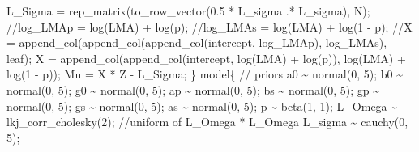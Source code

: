 \documentclass[
  12pt,
  letterpaper,
  DIV=11,
  numbers=noendperiod]{scrartcl}
\newenvironment{Shaded}{\begin{snugshade}}{\end{snugshade}}
\newcommand{\CommentTok}[1]{\textcolor[rgb]{0.37,0.37,0.37}{#1}}
\newcommand{\DecValTok}[1]{\textcolor[rgb]{0.68,0.00,0.00}{#1}}
\newcommand{\FloatTok}[1]{\textcolor[rgb]{0.68,0.00,0.00}{#1}}
\newcommand{\KeywordTok}[1]{\textcolor[rgb]{0.00,0.23,0.31}{#1}}
\newcommand{\NormalTok}[1]{\textcolor[rgb]{0.00,0.23,0.31}{#1}}
\begin{document}
\begin{Shaded}
\begin{Highlighting}[]
\NormalTok{  L\_Sigma = rep\_matrix(to\_row\_vector(}\FloatTok{0.5}\NormalTok{ * L\_sigma .* L\_sigma), N);}
  \CommentTok{//log\_LMAp = log(LMA) + log(p);}
  \CommentTok{//log\_LMAs = log(LMA) + log(1 {-} p);}
  \CommentTok{//X = append\_col(append\_col(append\_col(intercept, log\_LMAp), log\_LMAs), leaf);}
\NormalTok{  X = append\_col(append\_col(intercept, log(LMA) + log(p)), log(LMA) + log(}\DecValTok{1}\NormalTok{ {-} p));}
\NormalTok{  Mu = X * Z {-} L\_Sigma;}
\NormalTok{\}}
\KeywordTok{model}\NormalTok{\{}
  \CommentTok{// priors}
\NormalTok{  a0 \textasciitilde{} normal(}\DecValTok{0}\NormalTok{, }\DecValTok{5}\NormalTok{);}
\NormalTok{  b0 \textasciitilde{} normal(}\DecValTok{0}\NormalTok{, }\DecValTok{5}\NormalTok{);}
\NormalTok{  g0 \textasciitilde{} normal(}\DecValTok{0}\NormalTok{, }\DecValTok{5}\NormalTok{);}
\NormalTok{  ap \textasciitilde{} normal(}\DecValTok{0}\NormalTok{, }\DecValTok{5}\NormalTok{);}
\NormalTok{  bs \textasciitilde{} normal(}\DecValTok{0}\NormalTok{, }\DecValTok{5}\NormalTok{);}
\NormalTok{  gp \textasciitilde{} normal(}\DecValTok{0}\NormalTok{, }\DecValTok{5}\NormalTok{);}
\NormalTok{  gs \textasciitilde{} normal(}\DecValTok{0}\NormalTok{, }\DecValTok{5}\NormalTok{);}
\NormalTok{  as \textasciitilde{} normal(}\DecValTok{0}\NormalTok{, }\DecValTok{5}\NormalTok{);}
\NormalTok{  p \textasciitilde{} beta(}\DecValTok{1}\NormalTok{, }\DecValTok{1}\NormalTok{);}
\NormalTok{  L\_Omega \textasciitilde{} lkj\_corr\_cholesky(}\DecValTok{2}\NormalTok{); }\CommentTok{//uniform of L\_Omega * L\_Omega\textquotesingle{}}
\NormalTok{  L\_sigma \textasciitilde{} cauchy(}\DecValTok{0}\NormalTok{, }\DecValTok{5}\NormalTok{);}


\end{Highlighting}
\end{Shaded}
\end{document}
